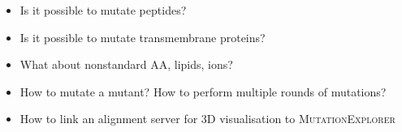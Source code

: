 \documentclass[11pt]{article}
\newcommand{\ME}{\textsc{MutationExplorer}}
\begin{document}
\begin{itemize}
\item Is it possible to mutate peptides?
\item Is it possible to mutate transmembrane proteins?
\item What about nonstandard AA, lipids, ions?
\item How to mutate a mutant? How to perform multiple rounds of mutations? 
\item How to link an alignment server for 3D visualisation to \ME
\end{itemize}
\end{document}
